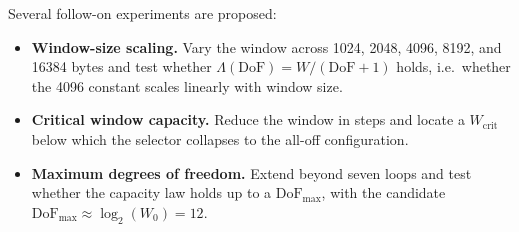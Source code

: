 Several follow-on experiments are proposed:

\begin{itemize}
  \item \textbf{Window-size scaling.} Vary the window across 1024, 2048, 4096,
        8192, and 16384 bytes and test whether $\Lambda(\mathrm{DoF}) =
        W/(\mathrm{DoF}+1)$ holds, i.e.\ whether the 4096 constant scales
        linearly with window size.
  \item \textbf{Critical window capacity.} Reduce the window in steps and locate
        a $W_{\text{crit}}$ below which the selector collapses to the all-off
        configuration.
  \item \textbf{Maximum degrees of freedom.} Extend beyond seven loops and test
        whether the capacity law holds up to a $\mathrm{DoF}_{\max}$, with the
        candidate $\mathrm{DoF}_{\max} \approx \log_2(W_0) = 12$.
\end{itemize}

